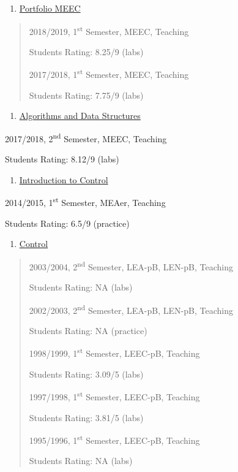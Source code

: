 \documentclass[
]{article}
\begin{document}
\begin{enumerate}
\def\labelenumi{\arabic{enumi}.}
\setcounter{enumi}{14}
\item
  \ul{Portfolio MEEC}
\end{enumerate}

\begin{quote}
2018/2019, 1\textsuperscript{st} Semester, MEEC, Teaching

Students Rating: 8.25/9 (labs)

2017/2018, 1\textsuperscript{st} Semester, MEEC, Teaching

Students Rating: 7.75/9 (labs)
\end{quote}

\begin{enumerate}
\def\labelenumi{\arabic{enumi}.}
\setcounter{enumi}{15}
\item
  \ul{Algorithms and Data Structures}
\end{enumerate}

2017/2018, 2\textsuperscript{nd} Semester, MEEC, Teaching

Students Rating: 8.12/9 (labs)

\begin{enumerate}
\def\labelenumi{\arabic{enumi}.}
\setcounter{enumi}{16}
\item
  \ul{Introduction to Control}
\end{enumerate}

2014/2015, 1\textsuperscript{st} Semester, MEAer, Teaching

Students Rating: 6.5/9 (practice)

\begin{enumerate}
\def\labelenumi{\arabic{enumi}.}
\setcounter{enumi}{17}
\item
  \ul{Control}
\end{enumerate}

\begin{quote}
2003/2004, 2\textsuperscript{nd} Semester, LEA-pB, LEN-pB, Teaching

Students Rating: NA (labs)

2002/2003, 2\textsuperscript{nd} Semester, LEA-pB, LEN-pB, Teaching

Students Rating: NA (practice)

1998/1999, 1\textsuperscript{st} Semester, LEEC-pB, Teaching

Students Rating: 3.09/5 (labs)

1997/1998, 1\textsuperscript{st} Semester, LEEC-pB, Teaching

Students Rating: 3.81/5 (labs)

1995/1996, 1\textsuperscript{st} Semester, LEEC-pB, Teaching

Students Rating: NA (labs)
\end{quote}
\end{document}

